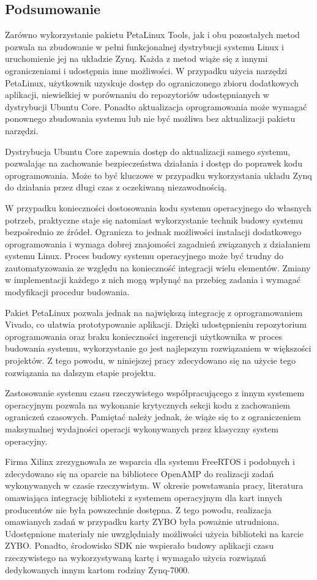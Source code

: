\subsection*{Podsumowanie} 

Zarówno wykorzystanie pakietu PetaLinux Tools, jak i obu pozostałych metod pozwala na zbudowanie w pełni funkcjonalnej dystrybucji systemu Linux i uruchomienie jej na układzie Zynq.
Każda z metod wiąże się z innymi ograniczeniami i udostępnia inne możliwości. 
W przypadku użycia narzędzi PetaLinux, użytkownik uzyskuje dostęp do ograniczonego zbioru dodatkowych aplikacji, niewielkiej w porównaniu do repozytoriów udostępnianych w dystrybucji Ubuntu Core. 
Ponadto aktualizacja oprogramowania może wymagać ponownego zbudowania systemu lub nie być możliwa bez aktualizacji pakietu narzędzi. 

Dystrybucja Ubuntu Core zapewnia dostęp do aktualizacji samego systemu, pozwalając na zachowanie bezpieczeństwa działania i dostęp do poprawek kodu oprogramowania. 
Może to być kluczowe w przypadku wykorzystania układu Zynq do działania przez długi czas z oczekiwaną niezawodnością. 

W przypadku konieczności dostosowania kodu systemu operacyjnego do własnych potrzeb, praktyczne staje się natomiast wykorzystanie technik budowy systemu bezpośrednio ze źródeł. 
Ogranicza to jednak możliwości instalacji dodatkowego oprogramowania i wymaga dobrej znajomości zagadnień związanych z działaniem systemu Linux. Proces budowy systemu operacyjnego może być trudny do zautomatyzowania ze względu na konieczność integracji wielu elementów. Zmiany w implementacji każdego z nich mogą wpłynąć na przebieg zadania i wymagać modyfikacji procedur budowania.

Pakiet PetaLinux pozwala jednak na największą integrację z oprogramowaniem Vivado, co ułatwia prototypowanie aplikacji. 
Dzięki udostępnieniu repozytorium oprogramowania oraz braku konieczności ingerencji użytkownika w proces budowania systemu, wykorzystanie go jest najlepszym rozwiązaniem w większości projektów. 
Z tego powodu, w niniejszej pracy zdecydowano się na użycie tego rozwiązania na dalszym etapie projektu.

Zastosowanie systemu czasu rzeczywistego współpracującego z innym systemem operacyjnym pozwala na wykonanie krytycznych sekcji kodu z zachowaniem ograniczeń czasowych. Pamiętać należy jednak, że wiąże się to z ograniczeniem maksymalnej wydajności operacji wykonywanych przez klasyczny system operacyjny.

Firma Xilinx zrezygnowała ze wsparcia dla systemu FreeRTOS i podobnych i zdecydowano się na oparcie na bibliotece OpenAMP do realizacji zadań wykonywanych w czasie rzeczywistym. 
W okresie powstawania pracy, literatura omawiająca integrację biblioteki z systemem operacyjnym dla kart innych producentów nie była powszechnie dostępna. 
Z tego powodu, realizacja omawianych zadań w przypadku karty ZYBO była poważnie utrudniona. Udostępnione materiały nie uwzględniały możliwości użycia biblioteki na karcie ZYBO. Ponadto, środowisko SDK nie wspierało budowy aplikacji czasu rzeczywistego na wykorzystywaną kartę i wymagało użycia rozwiązań dedykowanych innym kartom rodziny Zynq-7000.